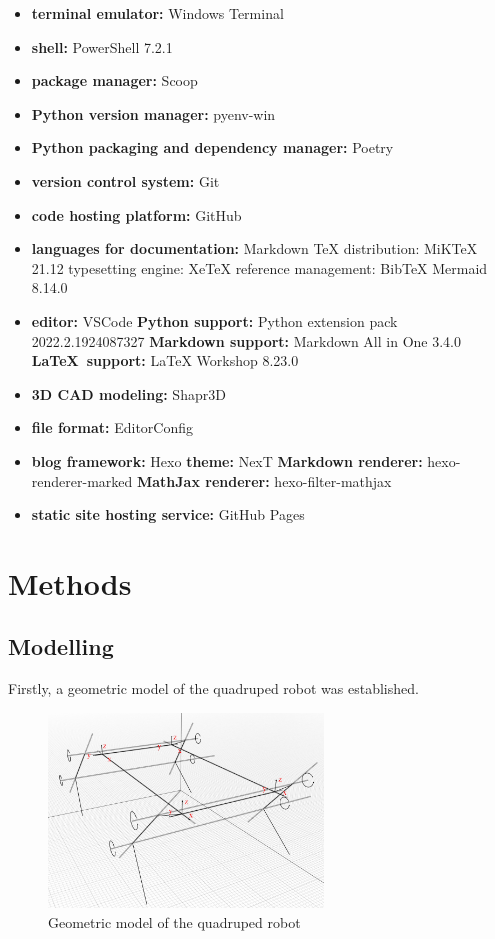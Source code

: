 \begin{itemize}
   \item \textbf{terminal emulator:} Windows Terminal
   \item \textbf{shell:} PowerShell 7.2.1
   \item \textbf{package manager:} Scoop
   \item \textbf{Python version manager:} pyenv-win
   \item \textbf{Python packaging and dependency manager:} Poetry
   \item \textbf{version control system:} Git
   \item \textbf{code hosting platform:} GitHub
   \item \textbf{languages for documentation:}
      \subitem Markdown
      \subitem \LaTeXe
         \subsubitem TeX distribution: MiKTeX 21.12
         \subsubitem typesetting engine: XeTeX
         \subsubitem reference management: BibTeX
      \subitem Mermaid 8.14.0
   \item \textbf{editor:} VSCode
      \subitem \textbf{Python support:} Python extension pack 2022.2.1924087327
      \subitem \textbf{Markdown support:} Markdown All in One 3.4.0
      \subitem \textbf{\LaTeX\ support:} LaTeX Workshop 8.23.0
   \item \textbf{3D CAD modeling:} Shapr3D
   \item \textbf{file format:} EditorConfig
   \item \textbf{blog framework:} Hexo
      \subitem \textbf{theme:} NexT
      \subitem \textbf{Markdown renderer:} hexo-renderer-marked
      \subitem \textbf{MathJax renderer:} hexo-filter-mathjax
   \item \textbf{static site hosting service:} GitHub Pages
\end{itemize}

\newpage
\section{Methods}

\subsection{Modelling}

Firstly, a geometric model of the quadruped robot was established.

\begin{figure}[htbp]
   \centering
   \includegraphics[width=0.65\textwidth]{figures/geometric_model.jpg}
   \caption{Geometric model of the quadruped robot}
   \label{fig:geometric_model}
\end{figure}

